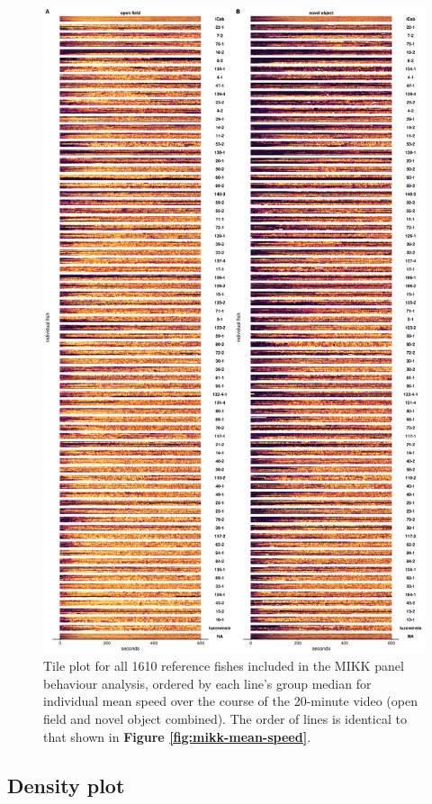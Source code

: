\documentclass[
]{book}
\begin{document}
\begin{figure}
\includegraphics[width=1\linewidth]{figs/mikk_behaviour/0.08_15_tile_sge} \caption{Tile plot for all 1610 reference fishes included in the MIKK panel behaviour analysis, ordered by each line's group median for individual mean speed over the course of the 20-minute video (open field and novel object combined). The order of lines is identical to that shown in \textbf{Figure \ref{fig:mikk-mean-speed}}.}\label{fig:mikk-all-tile-sge}
\end{figure}

\hypertarget{density-plot-1}{%
\subsection{Density plot}\label{density-plot-1}}
\end{document}

